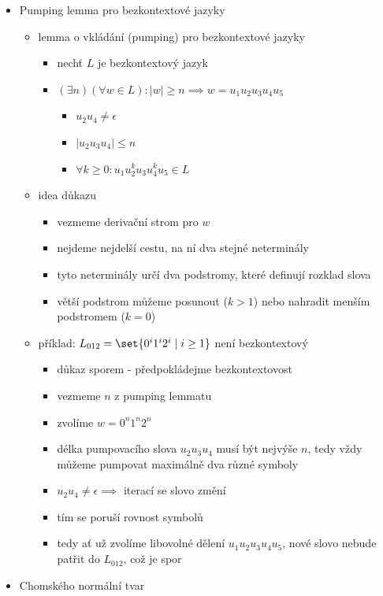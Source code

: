 \begin{itemize}
\begin{itemize}
\end{itemize}
\item Pumping lemma pro bezkontextové jazyky
\begin{itemize}
\item lemma o vkládání (pumping) pro bezkontextové jazyky
\begin{itemize}
\item nechť $L$ je bezkontextový jazyk
\item $(\exists n)(\forall w\in L):|w|\geq n\implies w=u_1u_2u_3u_4u_5$
\begin{itemize}
\item $u_2u_4\neq\epsilon$
\item $|u_2u_3u_4|\leq n$
\item $\forall k\geq 0:u_1u_2^ku_3u_4^ku_5\in L$
\end{itemize}
\end{itemize}
\item idea důkazu
\begin{itemize}
\item vezmeme derivační strom pro $w$
\item nejdeme nejdelší cestu, na ní dva stejné neterminály
\item tyto neterminály určí dva podstromy, které definují rozklad slova
\item větší podstrom můžeme posunout ($k\gt 1$) nebo nahradit menším podstromem ($k=0$)
\end{itemize}
\item příklad: $L_{012}=\set{0^i1^i2^i\mid i\geq 1}$ není bezkontextový
\begin{itemize}
\item důkaz sporem - předpokládejme bezkontextovost
\item vezmeme $n$ z pumping lemmatu
\item zvolíme $w=0^n1^n2^n$
\item délka pumpovacího slova $u_2u_3u_4$ musí být nejvýše $n$, tedy vždy můžeme pumpovat maximálně dva různé symboly
\item $u_2u_4\neq\epsilon\implies$ iterací se slovo změní
\item tím se poruší rovnost symbolů
\item tedy ať už zvolíme libovolné dělení $u_1u_2u_3u_4u_5$, nové slovo nebude patřit do $L_{012}$, což je spor
\end{itemize}
\end{itemize}
\item Chomského normální tvar
\begin{itemize}

\end{itemize}
\end{itemize}
